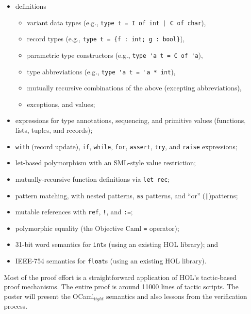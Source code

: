 \documentclass{llncs}
\newcommand{\OCL}{OCaml$_\mathit{light}$}
\begin{document}
\begin{itemize}
\item
definitions
\begin{itemize}
\item
variant data types (e.g., \verb+type t = I of int | C of char+),
\item
record types (e.g., \verb+type t = {f : int; g : bool}+),
\item
parametric type constructors (e.g., \verb+type 'a t = C of 'a+),
\item
type abbreviations (e.g., \verb+type 'a t = 'a * int+),
\item
mutually recursive combinations of the above (excepting abbreviations),
\item
exceptions, and values;
\end{itemize}
\item
expressions for type annotations, sequencing, and primitive values (functions, lists, tuples, and records);
\item
\verb+with+ (record update), \verb+if+, \verb+while+, \verb+for+, \verb+assert+, \verb+try+, and \verb+raise+ expressions;
\item
let-based polymorphism with an SML-style value restriction;
\item
mutually-recursive function definitions via \verb+let rec+;
\item
pattern matching, with nested patterns, \verb+as+ patterns, and ``or'' (\verb+|+)patterns;
\item
mutable references with \verb+ref+, \verb+!+, and \verb+:=+;
\item
polymorphic equality (the Objective Caml \verb+=+ operator);
\item
31-bit word semantics for \texttt{int}s (using an existing HOL library); and
\item
IEEE-754 semantics for \texttt{float}s (using an existing HOL library).
\end{itemize}

Most of the proof effort is a straightforward application of HOL's tactic-based proof mechanisms.  The entire proof is around 11000 lines of tactic scripts.
The poster will present the \OCL{} semantics and also lessons from the verification process.

\vspace{-30pt}
{\tiny

}
\end{document}
